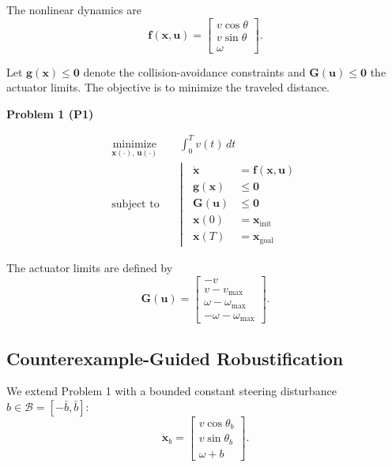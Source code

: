 \documentclass{article}
\begin{document}
The nonlinear dynamics are
\begin{equation}
\bm{f}(\bm{x},\bm{u}) =
\begin{bmatrix}
v\cos\theta\\
v\sin\theta\\
\omega
\end{bmatrix}.
\end{equation}

Let $\bm{g}(\bm{x})\leq\bm{0}$ denote the
collision-avoidance constraints and
$\bm{G}(\bm{u})\leq\bm{0}$ the actuator limits.
The objective is to minimize the traveled distance.

\medskip
\noindent\textbf{Problem 1 (P1)}

\begin{equation}
\begin{aligned}
\underset{\bm{x}(\cdot),\,\bm{u}(\cdot)}
{\operatorname{minimize}}
\quad & \int_0^T v(t)\,dt
\\[4pt]
\text{subject to}\quad &
\left|\;\;
\begin{aligned}
\dot{\bm{x}} &= \bm{f}(\bm{x},\bm{u})\\
\bm{g}(\bm{x}) &\leq \bm{0}
\\
\bm{G}(\bm{u}) &\leq\bm{0}
\\
\bm{x}(0) &= \bm{x}_{\mathrm{init}}
\\
\bm{x}(T) &= \bm{x}_{\mathrm{goal}}
\end{aligned}
\right.
\end{aligned}
\label{eq:unicycle_ocp}
\end{equation}

The actuator limits are defined by
\begin{equation}
\bm{G}(\bm{u}) =
\begin{bmatrix}
-v\\
v-v_{\max}\\
\omega-\omega_{\max}\\
-\omega-\omega_{\max}
\end{bmatrix}.
\end{equation}


\subsection{Counterexample-Guided Robustification}

We extend Problem 1 with a bounded constant steering
disturbance $b\in\mathcal B=[-\bar b,\bar b]$:
\begin{equation}
\dot{\bm{x}}_b =
\begin{bmatrix}
v\cos\theta_b\\
v\sin\theta_b\\
\omega+b
\end{bmatrix}.
\end{equation}
\end{document}
